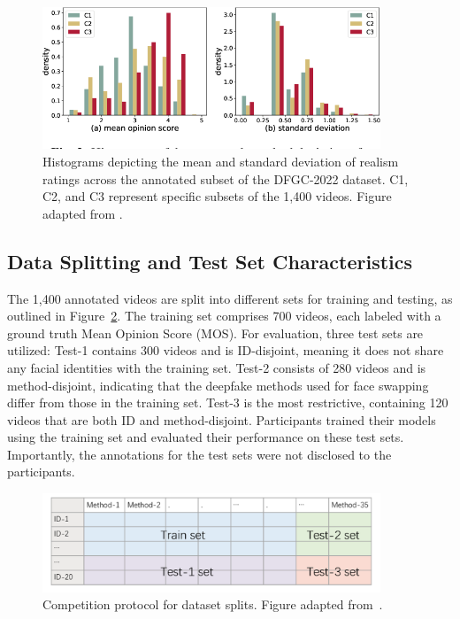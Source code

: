 \documentclass[a4paper,12pt,openright]{book}
\begin{document}
\begin{figure}[!htb]
    \centering
    \includegraphics[trim={1cm 1cm 0cm 0cm},clip,width=0.9\textwidth]{images/mos.png}
    \caption{Histograms depicting the mean and standard deviation of realism ratings across the annotated subset of the DFGC-2022 dataset. C1, C2, and C3 represent specific subsets of the 1,400 videos. Figure adapted from \cite{peng2022dfgc}.}
    \label{fig:MOS_distribution}
\end{figure}


\subsection{Data Splitting and Test Set Characteristics}

The 1,400 annotated videos are split into different sets for training and testing, as outlined in Figure~\ref{fig:data_splitting}. The training set comprises 700 videos, each labeled with a ground truth Mean Opinion Score (MOS). For evaluation, three test sets are utilized: Test-1 contains 300 videos and is ID-disjoint, meaning it does not share any facial identities with the training set. Test-2 consists of 280 videos and is method-disjoint, indicating that the deepfake methods used for face swapping differ from those in the training set. Test-3 is the most restrictive, containing 120 videos that are both ID and method-disjoint. Participants trained their models using the training set and evaluated their performance on these test sets. Importantly, the annotations for the test sets were not disclosed to the participants.

\begin{figure}[H]
    \centering
    \includegraphics[trim={0cm 0cm 0cm 0cm},clip,width=0.9\textwidth]{images/protocol.png}
    \caption{Competition protocol for dataset splits. Figure adapted from~\cite{peng_etal_2023}.}
    \label{fig:data_splitting}
\end{figure}
\end{document}
